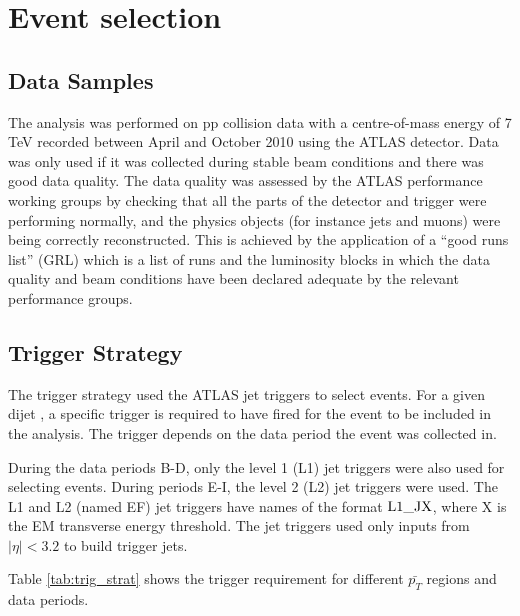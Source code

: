 \section {Event selection}
\label{sec:GBJ1:EvtSel}
\subsection{Data Samples}

The analysis was performed on  pp collision data with a centre-of-mass energy of 7 TeV recorded between April and October 2010 using the ATLAS detector. 
Data was only used if it was collected during stable beam conditions and there was good data quality. 
The data quality was assessed by the ATLAS performance working groups by checking that all the parts of the detector and trigger were performing normally, and the physics objects (for instance jets and muons) were being correctly reconstructed. 
This is achieved by the application of a ``good runs list'' (GRL) which is a list of runs and the luminosity blocks in which the data quality and beam conditions have been declared adequate by the relevant performance groups.


\subsection{Trigger Strategy}

The trigger strategy used the ATLAS jet triggers to select events.
For a given dijet \ptb{}, a specific trigger is required to have fired for the event to be included in the analysis.
The trigger depends on the data period the event was collected in.

During the data periods B-D, only the level 1 (L1) jet triggers were also used for selecting events. 
During periods E-I, the level 2 (L2) jet triggers were used. 
The L1 and L2 (named EF) jet triggers have names of the format $\rm L1\_JX$, where X is the EM transverse energy threshold.
The jet triggers used only inputs from $|\eta|<3.2$ to build trigger jets.
 
Table \ref{tab:trig_strat} shows the trigger requirement for different $\bar{p_T}$ regions and data periods.

